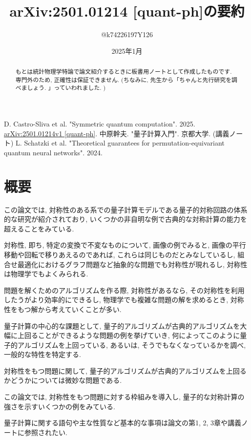 \documentclass[12pt]{jsarticle}
\title{arXiv:2501.01214 [quant-ph]の要約}
\author{@k74226197Y126}
\date{2025年1月}
\begin{document}
\maketitle
\begin{abstract}
    もとは統計物理学特論で論文紹介するときに板書用ノートとして作成したものです. 専門外のため, 正確性は保証できません. (ちなみに, 先生から「ちゃんと先行研究を調べましょう. 」っていわれました. )
\end{abstract}
\begin{flushleft}
    \begin{thebibliography}{100}
         D. Castro-Sliva et al. %
        "Symmetric quantum computation". 2025. \href{https://arxiv.org/abs/2501.01214}{arXiv:2501.01214v1 [quant-ph]}.
         中原幹夫. "量子計算入門". 京都大学. (講義ノート) %
         L. Schatzki et al. %
        "Theoretical guarantees for permutation-equivariant quantum neural networks". %
        2024. 
    \end{thebibliography}
\end{flushleft}
\section*{概要}
この論文\cite{1}では, 対称性のある系での量子計算モデルである量子的対称回路の体系的な研究が紹介されており, いくつかの非自明な例で古典的な対称計算の能力を超えることをみている. \par
対称性, 即ち, 特定の変換で不変なものについて, 画像の例でみると, 画像の平行移動や回転で移りあえるのであれば, これらは同じものだとみなしているし, 組合せ最適化におけるグラフ問題など抽象的な問題でも対称性が現れるし, 対称性は物理学でもよくみられる. \par
問題を解くためのアルゴリズムを作る際, 対称性があるなら, その対称性を利用したうがより効率的にできるし, 物理学でも複雑な問題の解を求めるとき, 対称性をもつ解から考えていくことが多い. \par
量子計算の中心的な課題として, 量子的アルゴリズムが古典的アルゴリズムを大幅に上回ることができるような問題の例を挙げていき, 何によってこのように量子的アルゴリズムを上回っている, あるいは, そうでもなくなっているかを調べ, 一般的な特性を特定する. \par
対称性をもつ問題に関して, 量子的アルゴリズムが古典的アルゴリズムを上回るかどうかについては微妙な問題である. \par
この論文\cite{1}では, 対称性をもつ問題に対する枠組みを導入し, 量子的な対称計算の強さを示すいくつかの例をみている. \par
量子計算に関する語句や主な性質など基本的な事項は論文\cite{1}の第1, 2, 3章や講義ノート\cite{2}に参照されたい. 
\end{document}
